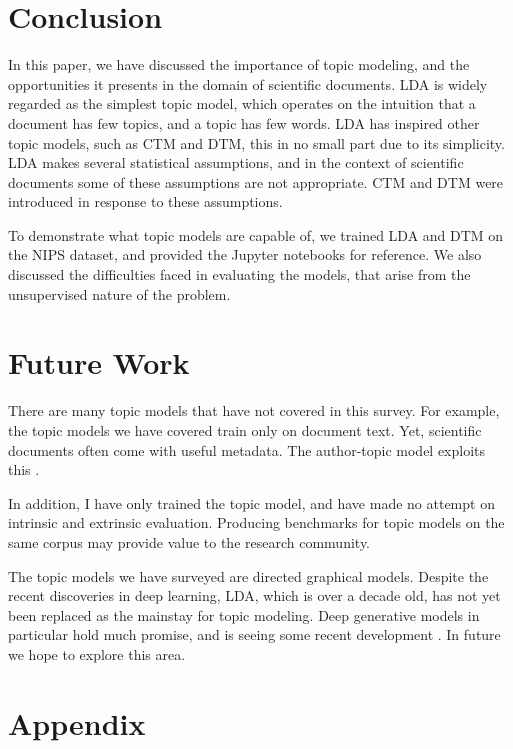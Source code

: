 \documentclass[letterpaper]{article}
\begin{document}
\section{Conclusion}
In this paper, we have discussed the importance of topic modeling, and
the opportunities it presents in the domain of scientific documents.
LDA is widely regarded as the simplest topic model, which operates on
the intuition that a document has few topics, and a topic has few
words. LDA has inspired other topic models, such as CTM and DTM, this
in no small part due to its simplicity. LDA makes several statistical
assumptions, and in the context of scientific documents some of these
assumptions are not appropriate. CTM and DTM were introduced in
response to these assumptions. 

To demonstrate what topic models are capable of, we trained LDA and
DTM on the NIPS dataset, and provided the Jupyter notebooks for
reference. We also discussed the difficulties faced in evaluating the
models, that arise from the unsupervised nature of the problem.

\section{Future Work}
There are many topic models that have not covered in this survey. For
example, the topic models we have covered train only on document text.
Yet, scientific documents often come with useful metadata. The
author-topic model exploits this \cite{rosen2004author}.

In addition, I have only trained the topic model, and have made no
attempt on intrinsic and extrinsic evaluation. Producing benchmarks
for topic models on the same corpus may provide value to the research
community.

The topic models we have surveyed are directed graphical models. Despite
the recent discoveries in deep learning, LDA, which is over a decade
old, has not yet been replaced as the mainstay for topic modeling.
Deep generative models in particular hold much promise, and is seeing
some recent development \cite{hinton2009replicated,
  larochelle2012neural}. In future we hope to explore this area.



\onecolumn

\section{Appendix}
\label{sec:appendix}
\end{document}
